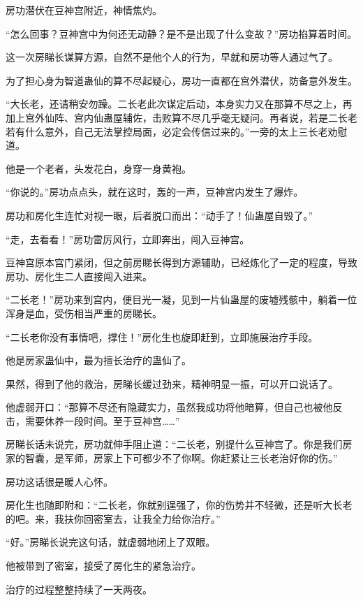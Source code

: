 
\begin{this_body}

房功潜伏在豆神宫附近，神情焦灼。

“怎么回事？豆神宫中为何还无动静？是不是出现了什么变故？”房功掐算着时间。

这一次房睇长谋算方源，自然不是他个人的行为，早就和房功等人通过气了。

为了担心身为智道蛊仙的算不尽起疑心，房功一直都在宫外潜伏，防备意外发生。

“大长老，还请稍安勿躁。二长老此次谋定后动，本身实力又在那算不尽之上，再加上宫外仙阵、宫内仙蛊屋辅佐，击败算不尽几乎毫无疑问。再者说，若是二长老若有什么意外，自己无法掌控局面，必定会传信过来的。”一旁的太上三长老劝慰道。

他是一个老者，头发花白，身穿一身黄袍。

“你说的。”房功点点头，就在这时，轰的一声，豆神宫内发生了爆炸。

房功和房化生连忙对视一眼，后者脱口而出：“动手了！仙蛊屋自毁了。”

“走，去看看！”房功雷厉风行，立即奔出，闯入豆神宫。

豆神宫原本宫门紧闭，但之前房睇长得到方源辅助，已经炼化了一定的程度，导致房功、房化生二人直接闯入进来。

“二长老！”房功来到宫内，便目光一凝，见到一片仙蛊屋的废墟残骸中，躺着一位浑身是血，受伤相当严重的房睇长。

“二长老你没有事情吧，撑住！”房化生也旋即赶到，立即施展治疗手段。

他是房家蛊仙中，最为擅长治疗的蛊仙了。

果然，得到了他的救治，房睇长缓过劲来，精神明显一振，可以开口说话了。

他虚弱开口：“那算不尽还有隐藏实力，虽然我成功将他暗算，但自己也被他反击，需要休养一段时间。至于豆神宫……”

房睇长话未说完，房功就伸手阻止道：“二长老，别提什么豆神宫了。你是我们房家的智囊，是军师，房家上下可都少不了你啊。你赶紧让三长老治好你的伤。”

房功这话很是暖人心怀。

房化生也随即附和：“二长老，你就别逞强了，你的伤势并不轻微，还是听大长老的吧。来，我扶你回密室去，让我全力给你治疗。”

“好。”房睇长说完这句话，就虚弱地闭上了双眼。

他被带到了密室，接受了房化生的紧急治疗。

治疗的过程整整持续了一天两夜。


\end{this_body}
